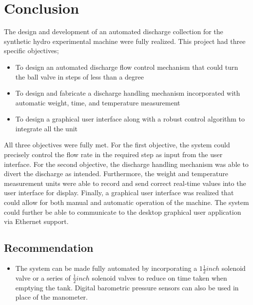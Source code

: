 \section{Conclusion}
\par
The design and development of an automated discharge collection for the synthetic hydro experimental machine were fully realized. This project had three specific objectives;
\begin{itemize}
    \item To design an automated discharge flow control mechanism that could turn the ball valve in steps of less than a degree
    \item To design and fabricate a discharge handling mechanism incorporated with automatic weight, time, and temperature measurement
    \item To design a graphical user interface along with a robust control algorithm to integrate all the unit
\end{itemize}
\par
All three objectives were fully met. For the first objective, the system could precisely control the flow rate in the required step as input from the user interface. For the second objective, the discharge handling mechanism was able to divert the discharge as intended. Furthermore, the weight and temperature measurement units were able to record and send correct real-time values into the user interface for display. Finally, a graphical user interface was realized that could allow for both manual and automatic operation of the machine. The system could further be able to communicate to the desktop graphical user application via Ethernet support.
\subsection{Recommendation}
\begin{itemize}
    \item The system can be made fully automated by incorporating a $1\frac{1}{2} inch$ solenoid valve or a series of $\frac{1}{2} inch$ solenoid valves to reduce on time taken when emptying the tank.  Digital barometric pressure sensors can also be used in place of the manometer.
\end{itemize}

